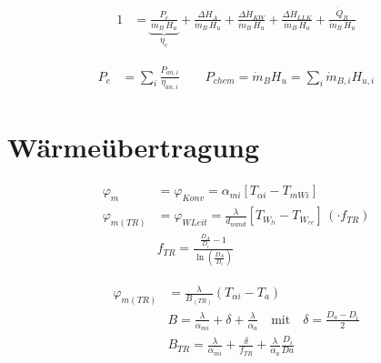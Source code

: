 \documentclass[english,threecolumn,color]{latex4ei/latex4ei_sheet}
\begin{document}
\begin{sectionbox}
	\begin{align*}
		1&=\underbrace{\frac{P_e}{\dot{m}_B \, H_u}}_{\eta_{e}}+\frac{\varDelta \dot{H}_A}{\dot{m}_B \, H_u}+\frac{\varDelta \dot{H}_{KW}}{\dot{m}_B \, H_u}+\frac{\varDelta \dot{H}_{LLK}}{\dot{m}_B \, H_u}
		+\frac{ \dot{Q}_R}{\dot{m}_B \, H_u}
	\end{align*}
\end{sectionbox}
\begin{sectionbox}
	\begin{align*}
		P_e&=\sum_{i} \frac{P_{an,i}}{\eta_{an,i}} \qquad
		P_{chem}=\dot{m}_B H_u = \sum_{i} \dot{m}_{B,i} H_{u,i}
	\end{align*}
\end{sectionbox}

\section{Wärmeübertragung}
\begin{sectionbox}
	\begin{align*}
		\varphi_m&=\varphi_{Konv}=\alpha_{mi}\left[ T_{\alpha i} -T_{mWi}\right]\\
		\varphi_{m(TR)}&=\varphi_{WLeit}=\frac{\lambda}{d_{wand}}\left[ T_{W_{li}} -T_{W_{re}}\right]\, \left(\cdot f_{TR}\right)\\
		& f_{TR} = \frac{\frac{D_A}{D_i}-1}{\ln\left( \frac{D_A}{D_i} \right)}
	\end{align*}
\end{sectionbox}
\begin{sectionbox}
	\begin{align*}
		\varphi_{m (TR)}&=\frac{\lambda}{B_{(TR)}}\left( T_{\alpha i}-T_{a} \right)\\
		&B=\frac{\lambda}{\alpha_{mi}}+\delta+\frac{\lambda}{\alpha_a} \quad \text{mit} \quad \delta=\frac{D_a-D_i}{2}\\
		&B_{TR}=\frac{\lambda}{\alpha_{mi}}+\frac{\delta}{f_{TR}}+\frac{\lambda}{\alpha_a}\frac{D_i}{Da}
	\end{align*}
\end{sectionbox}


\end{document}
